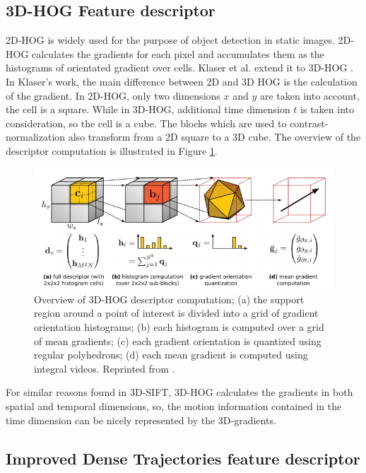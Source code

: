 \subsection{3D-HOG Feature descriptor}
\label{2_2_2}
2D-HOG is widely used for the purpose of object detection in static images. 2D-HOG calculates the gradients for each pixel and accumulates them as the histograms of orientated gradient over cells. Klaser et al. extend it to 3D-HOG \cite{alex2008}. In Klaser's work, the main difference between 2D and 3D HOG is the calculation of the gradient. In 2D-HOG, only two dimensions \(x\) and \(y\) are taken into account, the cell is a square. While in 3D-HOG, additional time dimension \(t\) is taken into consideration, so the cell is a cube. The blocks which are used to contrast-normalization also transform from a 2D square to a 3D cube. The overview of the descriptor computation is illustrated in Figure \ref{fig:3DHOG}.
\begin{figure}
	\includegraphics[width=\linewidth]{figs/3D_HOG.png}
	\caption{ Overview of 3D-HOG descriptor computation; (a) the support region around a point
		of interest is divided into a grid of gradient orientation histograms; (b) each histogram is
		computed over a grid of mean gradients; (c) each gradient orientation is quantized using
		regular polyhedrons; (d) each mean gradient is computed using integral videos. Reprinted from \cite{alex2008}.}
	\label{fig:3DHOG}
\end{figure}
\par 

For similar reasons found in 3D-SIFT, 3D-HOG calculates the gradients in both spatial and temporal dimensions, so, the motion information contained in the time dimension can be nicely represented by the 3D-gradients. 

\subsection{Improved Dense Trajectories feature descriptor}
\label{2_2_3}

